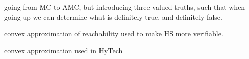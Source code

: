 \cite{Fecher2006} going from MC to AMC, but introducing three valued truths, such that when going up we can determine what is definitely true, and definitely false.

\cite{Halbwachs1994} convex approximation of reachability used to make HS more verifiable.

\cite{Henzinger} convex approximation used in HyTech
